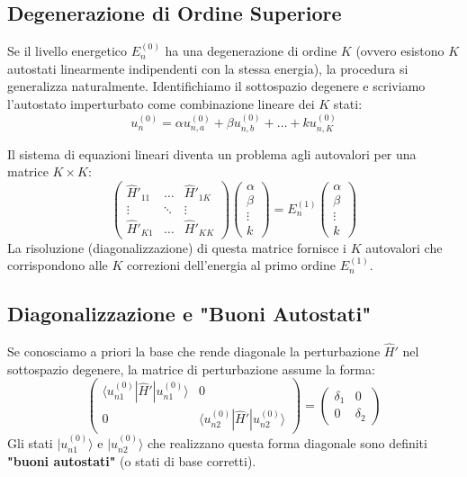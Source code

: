 \documentclass[11pt, a4paper]{article}
\begin{document}
\subsection{Degenerazione di Ordine Superiore} %

Se il livello energetico $E_n^{(0)}$ ha una degenerazione di ordine $K$ (ovvero esistono $K$ autostati linearmente indipendenti con la stessa energia), la procedura si generalizza naturalmente. %
Identifichiamo il sottospazio degenere e scriviamo l'autostato imperturbato come combinazione lineare dei $K$ stati: %
\begin{equation*}
    u_n^{(0)} = \alpha u_{n,a}^{(0)} + \beta u_{n,b}^{(0)} + \dots + k u_{n,K}^{(0)} %
\end{equation*}

\noindent
Il sistema di equazioni lineari diventa un problema agli autovalori per una matrice $K \times K$: %
\begin{equation}
    \boxed{ \begin{pmatrix} \hat{H}'_{11} & \dots & \hat{H}'_{1K} \\ \vdots & \ddots & \vdots \\ \hat{H}'_{K1} & \dots & \hat{H}'_{KK} \end{pmatrix} \begin{pmatrix} \alpha \\ \beta \\ \vdots \\ k \end{pmatrix} = E_n^{(1)} \begin{pmatrix} \alpha \\ \beta \\ \vdots \\ k \end{pmatrix} } %
\end{equation}
La risoluzione (diagonalizzazione) di questa matrice fornisce i $K$ autovalori che corrispondono alle $K$ correzioni dell'energia al primo ordine $E_n^{(1)}$. %


\subsection{Diagonalizzazione e "Buoni Autostati"}

Se conosciamo a priori la base che rende diagonale la perturbazione $\hat{H}'$ nel sottospazio degenere, la matrice di perturbazione assume la forma:
\begin{equation}
    \begin{pmatrix} 
        \langle u_{n1}^{(0)} | \hat{H}' | u_{n1}^{(0)} \rangle & 0 \\
        0 & \langle u_{n2}^{(0)} | \hat{H}' | u_{n2}^{(0)} \rangle 
    \end{pmatrix} 
    = \begin{pmatrix} \delta_1 & 0 \\ 0 & \delta_2 \end{pmatrix}
\end{equation}
Gli stati $|u_{n1}^{(0)}\rangle$ e $|u_{n2}^{(0)}\rangle$ che realizzano questa forma diagonale sono definiti \textbf{"buoni autostati"} (o stati di base corretti).
\end{document}

